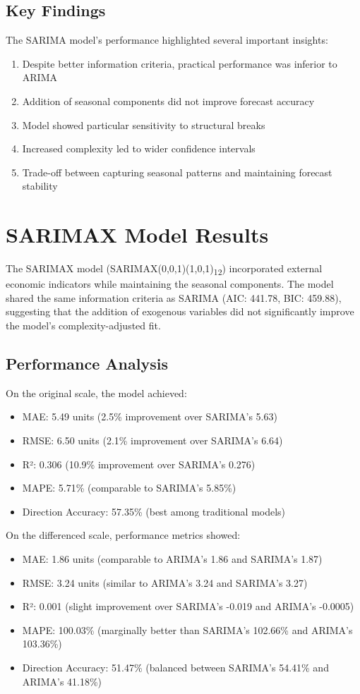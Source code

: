 \documentclass[12pt,a4paper]{report}
\begin{document}
\subsection{Key Findings}
The SARIMA model's performance highlighted several important insights:
\begin{enumerate}
    \item Despite better information criteria, practical performance was inferior to ARIMA
    \item Addition of seasonal components did not improve forecast accuracy
    \item Model showed particular sensitivity to structural breaks
    \item Increased complexity led to wider confidence intervals
    \item Trade-off between capturing seasonal patterns and maintaining forecast stability
\end{enumerate}

\section{SARIMAX Model Results}

The SARIMAX model (SARIMAX(0,0,1)(1,0,1)\textsubscript{12}) incorporated external economic indicators while maintaining the seasonal components. The model shared the same information criteria as SARIMA (AIC: 441.78, BIC: 459.88), suggesting that the addition of exogenous variables did not significantly improve the model's complexity-adjusted fit.

\subsection{Performance Analysis}
On the original scale, the model achieved:
\begin{itemize}
    \item MAE: 5.49 units (2.5\% improvement over SARIMA's 5.63)
    \item RMSE: 6.50 units (2.1\% improvement over SARIMA's 6.64)
    \item R²: 0.306 (10.9\% improvement over SARIMA's 0.276)
    \item MAPE: 5.71\% (comparable to SARIMA's 5.85\%)
    \item Direction Accuracy: 57.35\% (best among traditional models)
\end{itemize}

On the differenced scale, performance metrics showed:
\begin{itemize}
    \item MAE: 1.86 units (comparable to ARIMA's 1.86 and SARIMA's 1.87)
    \item RMSE: 3.24 units (similar to ARIMA's 3.24 and SARIMA's 3.27)
    \item R²: 0.001 (slight improvement over SARIMA's -0.019 and ARIMA's -0.0005)
    \item MAPE: 100.03\% (marginally better than SARIMA's 102.66\% and ARIMA's 103.36\%)
    \item Direction Accuracy: 51.47\% (balanced between SARIMA's 54.41\% and ARIMA's 41.18\%)
\end{itemize}
\end{document}
